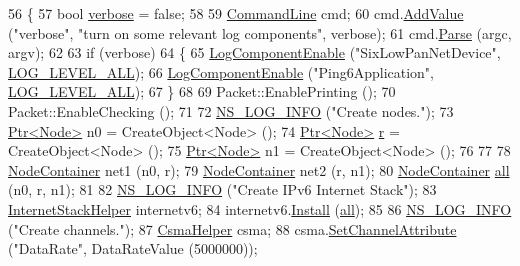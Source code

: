 \begin{DoxyCode}
56 \{
57   \textcolor{keywordtype}{bool} \hyperlink{openflow-switch_8cc_ab3f078684998b83967d507d0f453f454}{verbose} = \textcolor{keyword}{false};
58 
59   \hyperlink{classns3_1_1CommandLine}{CommandLine} cmd;
60   cmd.\hyperlink{classns3_1_1CommandLine_addcfb546c7ad4c8bd0965654d55beb8e}{AddValue} (\textcolor{stringliteral}{"verbose"}, \textcolor{stringliteral}{"turn on some relevant log components"}, verbose);
61   cmd.\hyperlink{classns3_1_1CommandLine_a5c10b85b3207e5ecb48d907966923156}{Parse} (argc, argv);
62 
63   \textcolor{keywordflow}{if} (verbose)
64     \{
65       \hyperlink{namespacens3_adc4ef4f00bb2f5f4edae67fc3bc27f20}{LogComponentEnable} (\textcolor{stringliteral}{"SixLowPanNetDevice"}, \hyperlink{namespacens3_aa6464a4d69551a9cc968e17a65f39bdba022b1237a4fd1b08d034471df3c58586}{LOG\_LEVEL\_ALL});
66       \hyperlink{namespacens3_adc4ef4f00bb2f5f4edae67fc3bc27f20}{LogComponentEnable} (\textcolor{stringliteral}{"Ping6Application"}, \hyperlink{namespacens3_aa6464a4d69551a9cc968e17a65f39bdba022b1237a4fd1b08d034471df3c58586}{LOG\_LEVEL\_ALL});
67     \}
68 
69   Packet::EnablePrinting ();
70   Packet::EnableChecking ();
71 
72   \hyperlink{group__logging_gafbd73ee2cf9f26b319f49086d8e860fb}{NS\_LOG\_INFO} (\textcolor{stringliteral}{"Create nodes."});
73   \hyperlink{classns3_1_1Ptr}{Ptr<Node>} n0 = CreateObject<Node> ();
74   \hyperlink{classns3_1_1Ptr}{Ptr<Node>} \hyperlink{structrgb_afd9a3feaf22de2f96ba25d19494235a6}{r} = CreateObject<Node> ();
75   \hyperlink{classns3_1_1Ptr}{Ptr<Node>} n1 = CreateObject<Node> ();
76 
77 
78   \hyperlink{classns3_1_1NodeContainer}{NodeContainer} net1 (n0, r);
79   \hyperlink{classns3_1_1NodeContainer}{NodeContainer} net2 (r, n1);
80   \hyperlink{classns3_1_1NodeContainer}{NodeContainer} \hyperlink{buildings__pathloss_8m_a00a349297fa58bc80ff5329e25dcfe28}{all} (n0, r, n1);
81 
82   \hyperlink{group__logging_gafbd73ee2cf9f26b319f49086d8e860fb}{NS\_LOG\_INFO} (\textcolor{stringliteral}{"Create IPv6 Internet Stack"});
83   \hyperlink{classns3_1_1InternetStackHelper}{InternetStackHelper} internetv6;
84   internetv6.\hyperlink{classns3_1_1InternetStackHelper_a6645b412f31283d2d9bc3d8a95cebbc0}{Install} (\hyperlink{buildings__pathloss_8m_a00a349297fa58bc80ff5329e25dcfe28}{all});
85 
86   \hyperlink{group__logging_gafbd73ee2cf9f26b319f49086d8e860fb}{NS\_LOG\_INFO} (\textcolor{stringliteral}{"Create channels."});
87   \hyperlink{classns3_1_1CsmaHelper}{CsmaHelper} csma;
88   csma.\hyperlink{classns3_1_1CsmaHelper_a886d900b2fe44433e0b81752dea7e7f1}{SetChannelAttribute} (\textcolor{stringliteral}{"DataRate"}, DataRateValue (5000000));

\end{DoxyCode}
